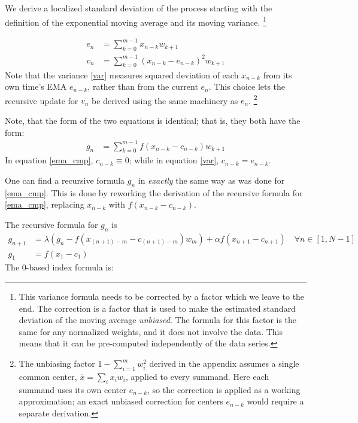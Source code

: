 \documentclass{article}
\begin{document}
We derive a localized standard deviation of the process starting
with the definition of the exponential moving average and its moving variance.%
\footnote{This variance formula needs to be corrected by a factor which we 
leave to the end. The correction is a factor that is used to make the 
estimated standard deviation of the moving average {\em unbiased\/}.
The formula for this factor is the same for any normalized weights, and it
does not involve the data. This means that it can be pre-computed
independently of the data series.}

\begin{align}
    e_n &=  \sum_{k=0}^{m-1} x_{n-k} w_{k+1} \label{ema_cmp} \\
    v_n &=  \sum_{k=0}^{m-1} (x_{n-k} - e_{n-k})^2 w_{k+1}  \label{var}
\end{align}
Note that the variance \eqref{var} measures squared deviation of each $x_{n-k}$ from
its own time's EMA $e_{n-k}$, rather than from the current $e_n$. This choice lets the
recursive update for $v_n$ be derived using the same machinery as $e_n$.%
\footnote{The unbiasing factor $1 - \sum_{i=1}^m w_i^2$ derived in the appendix
assumes a single common center, ${\bar x} = \sum_i x_i w_i$, applied to every summand.
Here each summand uses its own center $e_{n-k}$, so the correction is applied as a
working approximation; an exact unbiased correction for centers $e_{n-k}$ would
require a separate derivation.}

Note, that the form of the two equations is identical; that is, 
they both have the form:
\begin{align}
	g_n &= \sum_{k=0}^{m-1} f(x_{n-k} - c_{n-k}) w_{k+1} \label{gen_form}
\end{align}
In equation \eqref{ema_cmp}, $c_{n-k} \equiv 0$; while in equation
\eqref{var}, $c_{n-k} = e_{n-k}$.

One can find a recursive formula $g_n$ in {\em exactly\/} the same way as
was done for \eqref{ema_cmp}. This is done by reworking the derivation of
the recursive formula for \eqref{ema_cmp}, replacing $x_{n-k}$ with $f(x_{n-k} - c_{n-k})$.

The recursive formula for $g_n$ is
\begin{align}
    g_{n+1} &=  \lambda \left( g_{n} - f(x_{(n+1)-m} - c_{(n+1)-m}) w_m \right) + \alpha f(x_{n+1} - c_{n+1})   \quad \forall n \in [1, N-1] \\
    g_1     &=  f(x_1 - c_1) 
\end{align}
The 0-based index formula is:
\end{document}
